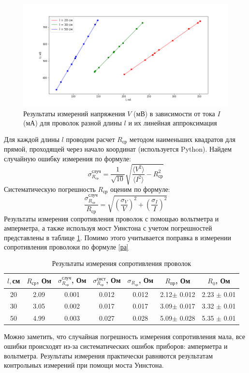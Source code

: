 \documentclass[a4paper,12pt]{article} %
\begin{document}
\begin{figure}[h!]
\begin{center}
\includegraphics[width=\textwidth]{графики}
\end{center}
\caption{Результаты измерений напряжения $V$ (мВ) в зависимости от тока $I$ (мА) для проволок разной длины $l$ и их линейная аппроксимация } 
\label{графики}
\end{figure}

Для каждой длины $ l $ проводим расчет $R_{\text{ср}}$ методом наименьших квадратов для прямой, проходящей через начало координат (используется Python). Найдем случайную ошибку измерения по формуле:
\begin{equation}
\sigma_{R_{\text{ср}}}^{\text{случ}}=\frac{1}{\sqrt{10}}\sqrt{\frac{\langle V^2 \rangle}{\langle I^2 \rangle}-R_{\text{ср}}^2}
\end{equation}
Систематическую погрешность $R_{\text{ср}}$ оценим по формуле:
\begin{equation}
\frac{\sigma_{R_{\text{ср}}}^{\text{случ}}}{R_{\text{ср}}}=\sqrt{\left( \frac{\sigma_V}{V} \right)^2+\left( \frac{\sigma_I}{I} \right)^2}
\end{equation}
Результаты измерения сопротивления проволок с помощью вольтметра и амперметра, а также используя мост Уинстона с учетом погрешностей представлены в таблице \ref{сопротив}. Помимо этого учитывается поправка в измерении сопротивления проволоки по формуле \ref{ра}
\begin{table}

\caption{Результаты измерения сопротивления проволок}
\begin{tabular}{|c|c|c|c|c|c|c|}
\hline 
$l, $см & $R_{\text{ср}}$, Ом & $\sigma_{R_{\text{ср}}}^{\text{случ}}$, Ом & $\sigma_{R_{\text{ср}}}^{\text{сист}}$, Ом & $\sigma_{R_{\text{ср}}}$, Ом & $R_{\text{пр}}$, Ом & $R_0$, Ом \\ 
\hline 
20 & 2.09 & 0.001 & 0.012 & 0.012 & 2.12$\pm$ 0.012& 2.23 $\pm$ 0.01 \\ 
\hline 
30 & 3.05 & 0.002 & 0.017 & 0.017 & 3.09$\pm$  0.017& 3.32 $\pm$ 0.01 \\ 
\hline 
50 & 4.99 & 0.003 & 0.027 & 0.028 & 5.09$\pm$ 0.028& 5.35 $\pm$ 0.01 \\ 
\hline 
\end{tabular} 
\label{сопротив}
\end{table} 
Можно заметить, что случайная погрешность измерения сопротивления мала, все ошибки происходят из-за систематических ошибок приборов: амперметра и вольтметра. Результаты измерения практически равняются результатам контрольных измерений при помощи моста Уинстона.
\end{document}
